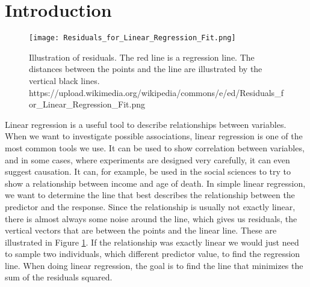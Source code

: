 \documentclass{article}
\begin{document}
\newpage

\tableofcontents

\newpage

\section{Introduction} \label{sec:intro}


\begin{figure}
  \centering
  \texttt{[image: Residuals\_for\_Linear\_Regression\_Fit.png]}
  \caption{Illustration of residuals. The red line is a regression line. The
    distances between the points and the line are illustrated by the vertical
    black lines.
    https://upload.wikimedia.org/wikipedia/commons/e/ed/Residuals\_for\_Linear\_Regression\_Fit.png
  }
  \label{fig:residuals}
  
\end{figure}

Linear regression is a useful tool to describe relationships between variables.
When we want to investigate possible associations, linear regression
is one of the most common tools we use. It can be used to show correlation between
variables, and in some cases, where experiments are designed very carefully, it can even suggest causation.
It can, for example, be used in the social sciences to try to show a relationship
between income and age of death. In simple linear regression, we want to determine the
line that best describes the relationship between the predictor and the
response. Since the relationship is usually not exactly linear, there is almost
always some noise around the line, which gives us residuals, the vertical
vectors that are between the points and the linear line. These are illustrated
in Figure \ref{fig:residuals}. If the relationship was
exactly linear we would just need to sample two individuals, which different
predictor value, to find the regression line. When doing linear
regression, the goal is to find the line that minimizes the sum of the residuals
squared. %
\end{document}
